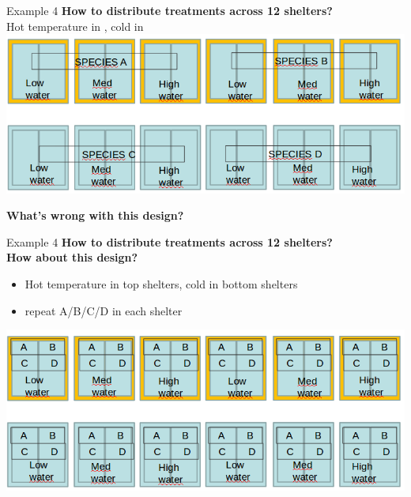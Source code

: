 \documentclass[10pt]{beamer}
\begin{document}
\begin{frame}{Example 4}
\textbf{How to distribute treatments across 12 shelters?\\}
 Hot temperature in {\color{orange}{orange}}, cold in {\color{blue!50!green}{turquoise}}\\
  \centering
  \includegraphics[width=\textwidth]{Figures/shelters2}
  
  \pause
  \vspace{0.1cm}
  \textbf{What’s wrong with this design?}
\end{frame}



\begin{frame}{Example 4}
\textbf{How to distribute treatments across 12 shelters?\\ How about this design?}
\begin{itemize}
 \item Hot temperature in top shelters, cold in bottom shelters
 \item repeat A/B/C/D in each shelter
\end{itemize}

  \centering
  \includegraphics[width=\textwidth]{Figures/shelters3}
\end{frame}
\end{document}
